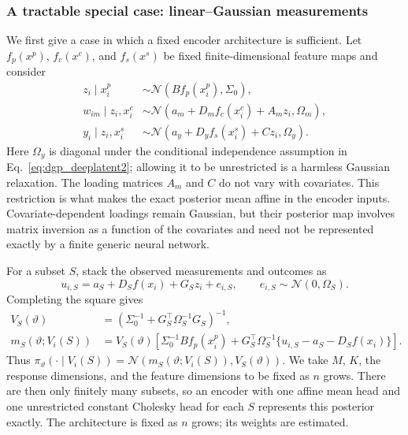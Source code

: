 \subsubsection{A tractable special case: linear--Gaussian measurements}
\label{subsubsec:linear_gaussian_case}

We first give a case in which a fixed encoder architecture is sufficient.
Let $f_p(x^p)$, $f_c(x^c)$, and $f_s(x^s)$ be fixed finite-dimensional
feature maps and consider
\begin{equation}
\label{eq:lg_dgp_main}
\begin{aligned}
 z_i\mid x_i^p
 &\sim\mathcal N(Bf_p(x_i^p),\Sigma_0),\\
 w_{im}\mid z_i,x_i^c
 &\sim\mathcal N(a_m+D_mf_c(x_i^c)+A_mz_i,\Omega_m),\\
 y_i\mid z_i,x_i^s
 &\sim\mathcal N(a_y+D_yf_s(x_i^s)+Cz_i,\Omega_y).
\end{aligned}
\end{equation}
Here $\Omega_y$ is diagonal under the conditional independence assumption in
Eq.~\eqref{eq:dgp_deeplatent2}; allowing it to be unrestricted is a harmless
Gaussian relaxation.  The loading matrices $A_m$ and $C$ do not vary with
covariates.  This
restriction is what makes the exact posterior mean affine in the encoder
inputs.  Covariate-dependent loadings remain Gaussian, but their posterior
map involves matrix inversion as a function of the covariates and need not be
represented exactly by a finite generic neural network.

For a subset $S$, stack the observed measurements and outcomes as
\[
 u_{i,S}=a_S+D_Sf(x_i)+G_Sz_i+e_{i,S},
 \qquad e_{i,S}\sim\mathcal N(0,\Omega_S).
\]
Completing the square gives
\begin{equation}
\label{eq:lg_posterior_main}
\begin{aligned}
 V_S(\vartheta)
 &=\left(\Sigma_0^{-1}+G_S^\top\Omega_S^{-1}G_S\right)^{-1},\\
 m_S(\vartheta;V_i(S))
 &=V_S(\vartheta)\left[
 \Sigma_0^{-1}Bf_p(x_i^p)
 +G_S^\top\Omega_S^{-1}
 \{u_{i,S}-a_S-D_Sf(x_i)\}\right].
\end{aligned}
\end{equation}
Thus $\pi_\vartheta(\cdot\mid V_i(S))=\mathcal
N(m_S(\vartheta;V_i(S)),V_S(\vartheta))$.  We take $M$, $K$, the response
dimensions, and the feature dimensions to be fixed as $n$ grows.  There are
then only finitely many subsets, so an encoder with one affine mean head and
one unrestricted constant Cholesky head for each $S$ represents this
posterior exactly.  The architecture is fixed as $n$ grows; its weights are
estimated.

